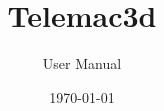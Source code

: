 \documentclass[Telemac3D]{../../data/TelemacDoc} %
\begin{document}
\let\cleardoublepage\clearpage

\title{Telemac3d}
\subtitle{User Manual}
\version{\telmaversion}
\date{\today}
\maketitle
\clearpage



\newpage

\thispagestyle{empty}

\TelemacCopyright{}




\pagestyle{empty} %

\tableofcontents%


\pagestyle{fancy} %












\end{document}
